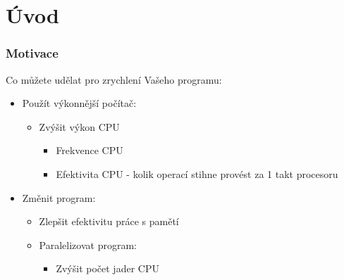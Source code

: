 \documentclass{beamer}
\subtitle{Lekce 01. Úvod}
\author{Petr Štěpán\\ \small\texttt{stepan@fel.cvut.cz}}
\begin{document}
\maketitle

\section{Úvod}


\begin{frame}
\frametitle{Motivace}
Co můžete udělat pro zrychlení Vašeho programu:
\begin{itemize}
\item Použít výkonnější počítač:
  \begin{itemize}
  \item Zvýšit výkon CPU 
    \begin{itemize}
    \item Frekvence CPU
    \item Efektivita CPU - kolik operací stihne provést za 1 takt procesoru
    \end{itemize}
  \end{itemize}
\item Změnit program:
  \begin{itemize}
  \item Zlepšit efektivitu práce s pamětí
  \item Paralelizovat program:
    \begin{itemize}
    \item Zvýšit počet jader CPU
    \end{itemize}
  \end{itemize}
\end{itemize}
\end{frame}
\end{document}

